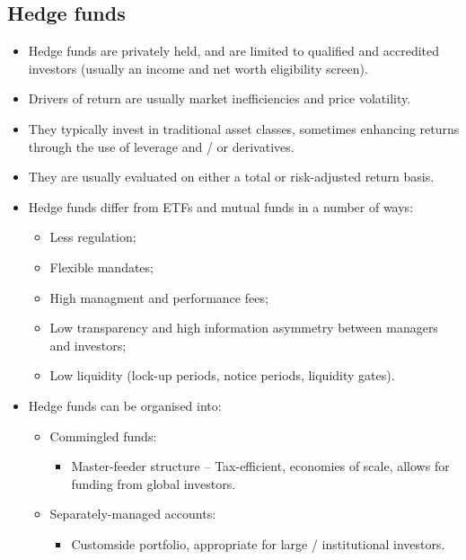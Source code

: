 \documentclass[../notes_compiled.tex]{subfiles}
\begin{document}
\subsection{Hedge funds}
\begin{itemize}
\item Hedge funds are privately held, and are limited to qualified and accredited investors (usually an income and net worth eligibility screen).
\item Drivers of return are usually market inefficiencies and price volatility.
\item They typically invest in traditional asset classes, sometimes enhancing returns through the use of leverage and / or derivatives.
\item They are usually evaluated on either a total or risk-adjusted return basis.
\item Hedge funds differ from ETFs and mutual funds in a number of ways:
\begin{itemize}
\item Less regulation;
\item Flexible mandates;
\item High managment and performance fees;
\item Low transparency and high information asymmetry between managers and investors;
\item Low liquidity (lock-up periods, notice periods, liquidity gates).
\end{itemize}
\item Hedge funds can be organised into:
\begin{itemize}
\item Commingled funds:
\begin{itemize}
\item Master-feeder structure -- Tax-efficient, economies of scale, allows for funding from global investors.
\end{itemize}
\item Separately-managed accounts:
\begin{itemize}
\item Customside portfolio, appropriate for large / institutional investors.
\end{itemize}
\end{itemize}
\end{itemize}
\end{document}
